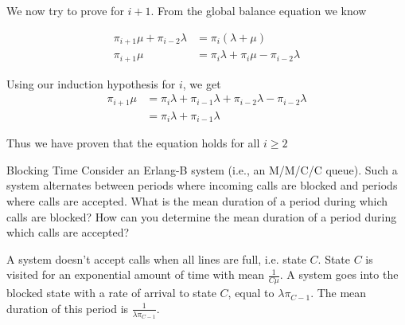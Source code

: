 \begin{solution}
  We now try to prove for $i+1$. From the global balance equation we know

  \begin{align*}
    \pi_{i+1}\mu + \pi_{i-2}\lambda &= \pi_i(\lambda + \mu) \\
    \pi_{i+1}\mu  &= \pi_i\lambda + \pi_i\mu - \pi_{i-2}\lambda
  \end{align*}

  Using our induction hypothesis for $i$, we get
  \begin{align*}
    \pi_{i+1}\mu  &= \pi_i\lambda + \pi_{i-1}\lambda + \pi_{i-2}\lambda - \pi_{i-2}\lambda \\
    &= \pi_i\lambda + \pi_{i-1}\lambda
  \end{align*}

  Thus we have proven that the equation holds for all $i \geq 2$
\end{solution}

\begin{problem}{Blocking Time}
Consider an Erlang-B system (i.e., an M/M/C/C queue). Such a system alternates between periods where incoming calls are blocked and periods where calls are accepted. What is the mean duration of a period during which calls are blocked? How can you determine the mean duration of a period during which calls are accepted?
\end{problem}

\begin{solution}
  A system doesn't accept calls when all lines are full, i.e. state $C$. State $C$ is visited for an exponential amount of time with mean $\frac{1}{C\mu}$. A system goes into the blocked state with a rate of arrival to state $C$, equal to $\lambda\pi_{C-1}$. The mean duration of this period is $\frac{1}{\lambda\pi_{C-1}}$.
\end{solution}
